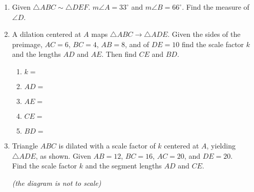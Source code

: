 \documentclass[12pt, twoside]{article}
\begin{document}
\begin{enumerate}
    \item Given $\triangle ABC \sim \triangle DEF$. $m\angle A = 33^\circ$ and $m\angle B = 66^\circ$. Find the measure of $\angle D$.
    
\newpage
  \item A dilation centered at $A$ maps $\triangle ABC \rightarrow \triangle ADE$. Given the sides of the preimage, $AC = 6$, $BC = 4$, $AB = 8$, and of $DE = 10$ find the scale factor $k$ and the lengths $AD$ and $AE$. Then find $CE$ and $BD$. 
  \begin{multicols}{2}
    \begin{enumerate}
      \item $k=$ \vspace{0.3cm}
      \item $AD=$ \vspace{0.3cm}
      \item $AE=$ \vspace{0.3cm}
      \item $CE=$
      \item $BD=$
    \end{enumerate}
  \begin{flushright}
  \end{flushright} 
\end{multicols}\vspace{1.5cm}
  
  \item Triangle $ABC$ is dilated with a scale factor of $k$ centered at $A$, yielding $\triangle ADE$, as shown. Given $AB=12$, $BC=16$, $AC=20$, and $DE=20$. \\[0.25cm] Find the scale factor $k$ and the segment lengths $AD$ and $CE$.
  \begin{flushright} \emph{(the diagram is not to scale)} \end{flushright}
    \begin{flushright}
    \end{flushright} \vspace{2.5cm}


\end{enumerate}
\end{document}
